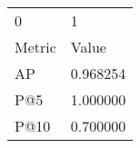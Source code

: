 \begin{tabular}{ll}
0 & 1 \\
Metric & Value \\
AP & 0.968254 \\
P@5 & 1.000000 \\
P@10 & 0.700000 \\
\end{tabular}
